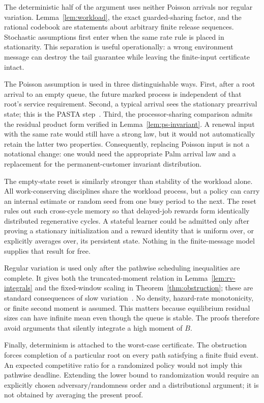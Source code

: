 The deterministic half of the argument uses neither Poisson arrivals nor regular variation.  Lemma~\ref{lem:workload}, the exact guarded-sharing factor, and the rational codebook are statements about arbitrary finite release sequences.  Stochastic assumptions first enter when the same rate rule is placed in stationarity.  This separation is useful operationally: a wrong environment message can destroy the tail guarantee while leaving the finite-input certificate intact.

The Poisson assumption is used in three distinguishable ways.  First, after a root arrival to an empty queue, the future marked process is independent of that root's service requirement.  Second, a typical arrival sees the stationary prearrival state; this is the PASTA step~\cite{wolff1982}.  Third, the processor-sharing comparison admits the residual product form verified in Lemma~\ref{lem:ps-invariant}.  A renewal input with the same rate would still have a strong law, but it would not automatically retain the latter two properties.  Consequently, replacing Poisson input is not a notational change: one would need the appropriate Palm arrival law and a replacement for the permanent-customer invariant distribution.

The empty-state reset is similarly stronger than stability of the workload alone.  All work-conserving disciplines share the workload process, but a policy can carry an internal estimate or random seed from one busy period to the next.  The reset rules out such cross-cycle memory so that delayed-job rewards form identically distributed regenerative cycles.  A stateful learner could be admitted only after proving a stationary initialization and a reward identity that is uniform over, or explicitly averages over, its persistent state.  Nothing in the finite-message model supplies that result for free.

Regular variation is used only after the pathwise scheduling inequalities are complete.  It gives both the truncated-moment relation in Lemma~\ref{lem:rv-integrals} and the fixed-window scaling in Theorem~\ref{thm:obstruction}; these are standard consequences of slow variation~\cite{bingham1987,foss2013}.  No density, hazard-rate monotonicity, or finite second moment is assumed.  This matters because equilibrium residual sizes can have infinite mean even though the queue is stable.  The proofs therefore avoid arguments that silently integrate a high moment of $B$.

Finally, determinism is attached to the worst-case certificate.  The obstruction forces completion of a particular root on every path satisfying a finite fluid event.  An expected competitive ratio for a randomized policy would not imply this pathwise deadline.  Extending the lower bound to randomization would require an explicitly chosen adversary/randomness order and a distributional argument; it is not obtained by averaging the present proof.

